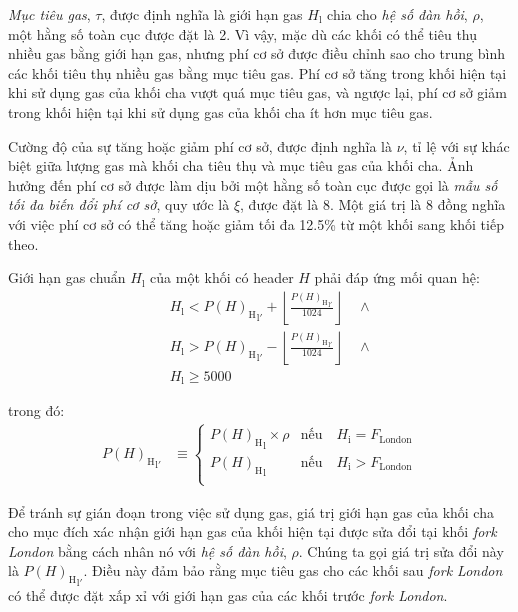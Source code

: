 \documentclass[9pt,oneside]{amsart}
\begin{document}
\begin{multicols}{2}
\textit{Mục tiêu gas}, $\tau$, được định nghĩa là giới hạn gas $H_{\mathrm{l}}$ chia cho \textit{hệ số đàn hồi}, $\rho$, một hằng số toàn cục được đặt là 2. Vì vậy, mặc dù các khối có thể tiêu thụ nhiều gas bằng giới hạn gas, nhưng phí cơ sở được điều chỉnh sao cho trung bình các khối tiêu thụ nhiều gas bằng mục tiêu gas. Phí cơ sở tăng trong khối hiện tại khi sử dụng gas của khối cha vượt quá mục tiêu gas, và ngược lại, phí cơ sở giảm trong khối hiện tại khi sử dụng gas của khối cha ít hơn mục tiêu gas.

Cường độ của sự tăng hoặc giảm phí cơ sở, được định nghĩa là $\nu$, tỉ lệ với sự khác biệt giữa lượng gas mà khối cha tiêu thụ và mục tiêu gas của khối cha. Ảnh hưởng đến phí cơ sở được làm dịu bởi một hằng số toàn cục được gọi là \textit{mẫu số tối đa biến đổi phí cơ sở}, quy ước là $\xi$, được đặt là 8. Một giá trị là 8 đồng nghĩa với việc phí cơ sở có thể tăng hoặc giảm tối đa 12.5\% từ một khối sang khối tiếp theo.

\hypertarget{block_gas_limit_H__l}{}Giới hạn gas chuẩn $H_{\mathrm{l}}$ của một khối có header $H$ phải đáp ứng mối quan hệ:
\begin{eqnarray}
& & H_{\mathrm{l}} < {P(H)_{\mathrm{H}}}_{\mathrm{l}'} + \left\lfloor\frac{{P(H)_{\mathrm{H}}}_{\mathrm{l}'}}{1024}\right\rfloor \quad \wedge \\
\nonumber& & H_{\mathrm{l}} > {P(H)_{\mathrm{H}}}_{\mathrm{l}'} - \left\lfloor\frac{{P(H)_{\mathrm{H}}}_{\mathrm{l}'}}{1024}\right\rfloor \quad \wedge \\
\nonumber& & H_{\mathrm{l}} \geqslant 5000
\end{eqnarray}

trong đó:
  \begin{align}
    {P(H)_{\mathrm{H}}}_{\mathrm{l}'} &\equiv \begin{cases}
      {P(H)_{\mathrm{H}}}_{\mathrm{l}} \times \rho &  \text{nếu} \quad H_{\mathrm{i}} = F_{\mathrm{London}} \\
      {P(H)_{\mathrm{H}}}_{\mathrm{l}} &  \text{nếu} \quad H_{\mathrm{i}} > F_{\mathrm{London}} \\
  \end{cases}
\end{align}

Để tránh sự gián đoạn trong việc sử dụng gas, giá trị giới hạn gas của khối cha cho mục đích xác nhận giới hạn gas của khối hiện tại được sửa đổi tại khối \textit{fork London} bằng cách nhân nó với \textit{hệ số đàn hồi}, $\rho$. Chúng ta gọi giá trị sửa đổi này là ${P(H)_{\mathrm{H}}}_{\mathrm{l}'}$. Điều này đảm bảo rằng mục tiêu gas cho các khối sau \textit{fork London} có thể được đặt xấp xỉ với giới hạn gas của các khối trước \textit{fork London}.


\end{multicols}
\end{document}

